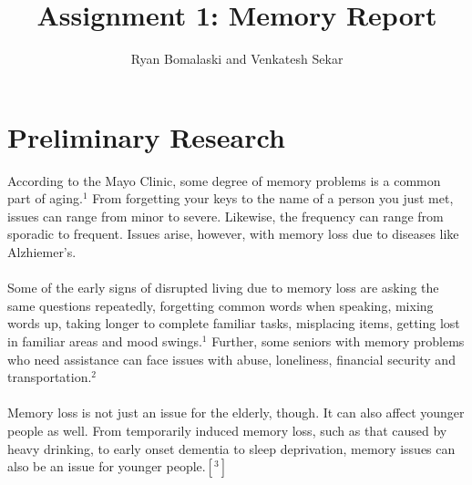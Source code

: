 \documentclass[12pt]{article}
\theoremstyle{plain}
\theoremstyle{definition}
\begin{document}
\title{Assignment 1: Memory Report}
\author{Ryan Bomalaski and Venkatesh Sekar}
\predate{}
\postdate{}
\date{}

\maketitle

\section*{Preliminary Research}
According to the Mayo Clinic, some degree of memory problems is a common part of aging.${^1}$  From forgetting your keys to the name of a person you just met, issues can range from minor to severe.  Likewise, the frequency can range from sporadic to frequent.  Issues arise, however, with memory loss due to diseases like Alzhiemer's.\\
\\
Some of the early signs of disrupted living due to memory loss are asking the same questions repeatedly, forgetting common words when speaking, mixing words up, taking longer to complete familiar tasks, misplacing items, getting lost in familiar areas and mood swings.${^1}$  Further, some seniors with memory problems who need assistance can face issues with abuse, loneliness, financial security and transportation.${^2}$\\
\\
Memory loss is not just an issue for the elderly, though. It can also affect younger people as well.  From temporarily induced memory loss, such as that caused by heavy drinking, to early onset dementia to sleep deprivation, memory issues can also be an issue for younger people.$[^3]$
\end{document}
